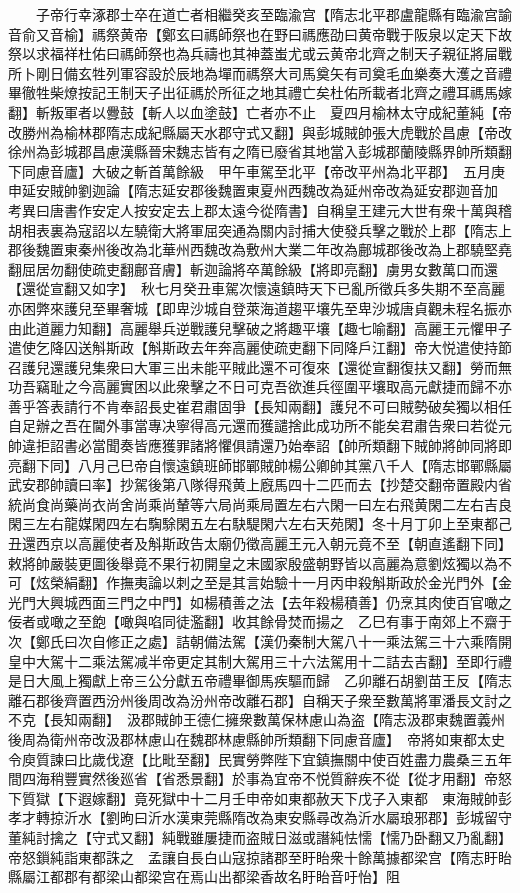 　　子帝行幸涿郡士卒在道亡者相繼癸亥至臨渝宫【隋志北平郡盧龍縣有臨渝宫諭音俞又音榆】禡祭黄帝【鄭玄曰禡師祭也在野曰禡應劭曰黄帝戰于阪泉以定天下故祭以求福祥杜佑曰禡師祭也為兵禱也其神蓋蚩尤或云黄帝北齊之制天子親征將屇戰所卜剛日備玄牲列軍容設於辰地為墠而禡祭大司馬奠矢有司奠毛血樂奏大濩之音禮畢徹牲柴燎按記王制天子出征禡於所征之地其禮亡矣杜佑所載者北齊之禮耳禡馬嫁翻】斬叛軍者以釁鼓【斬人以血塗鼓】亡者亦不止　夏四月榆林太守成紀董純【帝改勝州為榆林郡隋志成紀縣屬天水郡守式又翻】與彭城賊帥張大虎戰於昌慮【帝改徐州為彭城郡昌慮漢縣晉宋魏志皆有之隋已廢省其地當入彭城郡蘭陵縣界帥所類翻下同慮音廬】大破之斬首萬餘級　甲午車駕至北平【帝改平州為北平郡】　五月庚申延安賊帥劉迦論【隋志延安郡後魏置東夏州西魏改為延州帝改為延安郡迦音加　考異曰唐書作安定人按安定去上郡太遠今從隋書】自稱皇王建元大世有衆十萬與稽胡相表裏為寇詔以左驍衛大將軍屈突通為關内討捕大使發兵擊之戰於上郡【隋志上郡後魏置東秦州後改為北華州西魏改為敷州大業二年改為鄜城郡後改為上郡驍堅堯翻屈居勿翻使疏吏翻鄜音膚】斬迦論將卒萬餘級【將即亮翻】虜男女數萬口而還【還從宣翻又如字】　秋七月癸丑車駕次懷遠鎮時天下已亂所徵兵多失期不至高麗亦困弊來護兒至畢奢城【即卑沙城自登萊海道趨平壤先至卑沙城唐貞觀未程名振亦由此道麗力知翻】高麗舉兵逆戰護兒擊破之將趣平壤【趣七喻翻】高麗王元懼甲子遣使乞降囚送斛斯政【斛斯政去年奔高麗使疏吏翻下同降戶江翻】帝大悦遣使持節召護兒還護兒集衆曰大軍三出未能平賊此還不可復來【還從宣翻復扶又翻】勞而無功吾竊耻之今高麗實困以此衆擊之不日可克吾欲進兵徑圍平壤取高元獻捷而歸不亦善乎答表請行不肯奉詔長史崔君肅固爭【長知兩翻】護兒不可曰賊勢破矣獨以相任自足辦之吾在閫外事當專决寧得高元還而獲譴捨此成功所不能矣君肅告衆曰若從元帥違拒詔書必當聞奏皆應獲罪諸將懼俱請還乃始奉詔【帥所類翻下賊帥將帥同將即亮翻下同】八月己巳帝自懷遠鎮班師邯鄲賊帥楊公卿帥其黨八千人【隋志邯鄲縣屬武安郡帥讀曰率】抄駕後第八隊得飛黄上廐馬四十二匹而去【抄楚交翻帝置殿内省統尚食尚藥尚衣尚舍尚乘尚輦等六局尚乘局置左右六閑一曰左右飛黄閑二左右吉良閑三左右龍媒閑四左右騊駼閑五左右駃騠閑六左右天苑閑】冬十月丁卯上至東都己丑還西京以高麗使者及斛斯政告太廟仍徵高麗王元入朝元竟不至【朝直遙翻下同】敕將帥嚴裝更圖後舉竟不果行初開皇之末國家殷盛朝野皆以高麗為意劉炫獨以為不可【炫榮絹翻】作撫夷論以刺之至是其言始驗十一月丙申殺斛斯政於金光門外【金光門大興城西面三門之中門】如楊積善之法【去年殺楊積善】仍烹其肉使百官噉之佞者或噉之至飽【噉與啗同徒濫翻】收其餘骨焚而揚之　乙巳有事于南郊上不齋于次【鄭氏曰次自修正之處】詰朝備法駕【漢仍秦制大駕八十一乘法駕三十六乘隋開皇中大駕十二乘法駕减半帝更定其制大駕用三十六法駕用十二詰去吉翻】至即行禮是日大風上獨獻上帝三公分獻五帝禮畢御馬疾驅而歸　乙卯離石胡劉苗王反【隋志離石郡後齊置西汾州後周改為汾州帝改離石郡】自稱天子衆至數萬將軍潘長文討之不克【長知兩翻】　汲郡賊帥王德仁擁衆數萬保林慮山為盗【隋志汲郡東魏置義州後周為衛州帝改汲郡林慮山在魏郡林慮縣帥所類翻下同慮音廬】　帝將如東都太史令庾質諫曰比歲伐遼【比毗至翻】民實勞弊陛下宜鎮撫關中使百姓盡力農桑三五年間四海稍豐實然後廵省【省悉景翻】於事為宜帝不悦質辭疾不從【從才用翻】帝怒下質獄【下遐嫁翻】竟死獄中十二月壬申帝如東都赦天下戊子入東都　東海賊帥彭孝才轉掠沂水【劉昫曰沂水漢東莞縣隋改為東安縣尋改為沂水屬琅邪郡】彭城留守董純討擒之【守式又翻】純戰雖屢捷而盗賊日滋或譖純怯懦【懦乃卧翻又乃亂翻】帝怒鎻純詣東都誅之　孟讓自長白山寇掠諸郡至盱眙衆十餘萬據都梁宫【隋志盱眙縣屬江都郡有都梁山都梁宫在焉山出都梁香故名盱眙音吁怡】阻